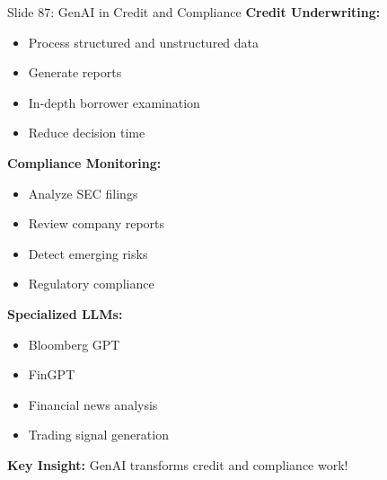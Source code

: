 \documentclass[8pt]{beamer}
\begin{document}
	\begin{frame}{Slide 87: GenAI in Credit and Compliance}
		\fontsize{6.5}{7.5}\selectfont
		\textbf{Credit Underwriting:}
		\begin{itemize}
			\item Process structured and unstructured data
			\item Generate reports
			\item In-depth borrower examination
			\item Reduce decision time
		\end{itemize}
		
		\vspace{0.1cm}
		\textbf{Compliance Monitoring:}
		\begin{itemize}
			\item Analyze SEC filings
			\item Review company reports
			\item Detect emerging risks
			\item Regulatory compliance
		\end{itemize}
		
		\vspace{0.1cm}
		\textbf{Specialized LLMs:}
		\begin{itemize}
			\item Bloomberg GPT
			\item FinGPT
			\item Financial news analysis
			\item Trading signal generation
		\end{itemize}
		
		\textcolor{myblue}{\textbf{Key Insight:}} GenAI transforms credit and compliance work!
	\end{frame}
	
\end{document}
